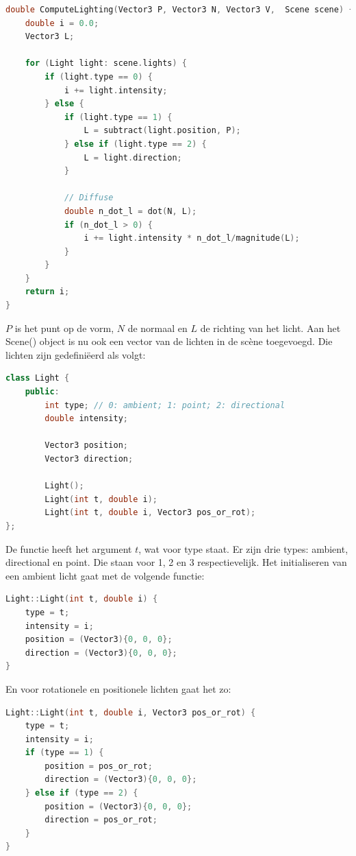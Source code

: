 \documentclass[12pt, a4paper]{article}
\begin{document}
\begin{lstlisting}[language=C++]
double ComputeLighting(Vector3 P, Vector3 N, Vector3 V,  Scene scene) {
    double i = 0.0;
    Vector3 L;

    for (Light light: scene.lights) {
        if (light.type == 0) {
            i += light.intensity;
        } else {
            if (light.type == 1) {
                L = subtract(light.position, P);
            } else if (light.type == 2) {
                L = light.direction;
            }

            // Diffuse
            double n_dot_l = dot(N, L);
            if (n_dot_l > 0) {
                i += light.intensity * n_dot_l/magnitude(L);
            }
        }
    }
    return i;
}
\end{lstlisting}

$P$ is het punt op de vorm, $N$ de normaal en $L$ de richting van het licht. Aan het Scene() object is nu ook een vector van de lichten in de scène toegevoegd. Die lichten zijn gedefiniëerd als volgt:

\begin{lstlisting}[language=C++]
class Light {
    public:
        int type; // 0: ambient; 1: point; 2: directional
        double intensity;

        Vector3 position;
        Vector3 direction;

        Light();
        Light(int t, double i);
        Light(int t, double i, Vector3 pos_or_rot);
};
\end{lstlisting}

De functie heeft het argument $t$, wat voor type staat. Er zijn drie types: ambient, directional en point. Die staan voor 1, 2 en 3 respectievelijk. Het initialiseren van een ambient licht gaat met de volgende functie:

\begin{lstlisting}[language=C++]
Light::Light(int t, double i) {
    type = t;
    intensity = i;
    position = (Vector3){0, 0, 0};
    direction = (Vector3){0, 0, 0};
}
\end{lstlisting}

En voor rotationele en positionele lichten gaat het zo:

\begin{lstlisting}[language=C++]
Light::Light(int t, double i, Vector3 pos_or_rot) {
    type = t;
    intensity = i;
    if (type == 1) {
        position = pos_or_rot;
        direction = (Vector3){0, 0, 0};
    } else if (type == 2) {
        position = (Vector3){0, 0, 0};
        direction = pos_or_rot;
    }
}
\end{lstlisting}
\end{document}
